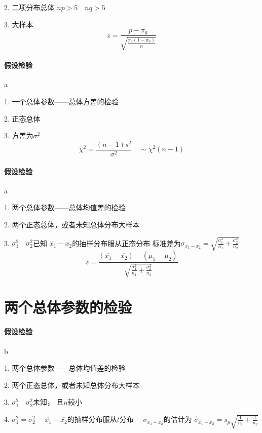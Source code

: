 \documentclass[UTF8,10pt]{book}
\begin{document}
{        2. 二项分布总体 $np>5 \quad nq>5$ 
        
        3. 大样本	
        $$ z = \frac{p-\pi_0}{ \sqrt{\frac{\pi_0(1-\pi_0)}{n}} } $$
        
        \paragraph{假设检验} a
        
        1. 一个总体参数——总体方差的检验 
        
        2. 正态总体 
        
        3. 方差为$\sigma^2$	
        $$ \chi^2 = \frac{(n-1)s^2}{\sigma^2} \quad \sim \chi^2(n-1) $$
        
        \paragraph{假设检验}   a
        
        1. 两个总体参数——总体均值差的检验 
        
        2. 两个正态总体，或者未知总体分布大样本 
        
        3. $\sigma_1^2 \quad \sigma_2^2$已知	
        $\overline{x_1} - \overline{x_2}$的抽样分布服从正态分布 
        标准差为$ \sigma_{\overline{x_1} - \overline{x_2}} =\sqrt{\frac{\sigma_1^2}{n_1}+\frac{\sigma_2^2}{n_2}} $ 
        $$ z = \frac{(\overline{x_1} - \overline{x_2} )- (\mu_1-\mu_2)}{\sqrt{\frac{\sigma_1^2}{n_1}+\frac{\sigma_2^2}{n_2}} } $$
        
    \section{两个总体参数的检验}

    
    \paragraph{假设检验} b
   
    1. 两个总体参数——总体均值差的检验 
    
    2. 两个正态总体，或者未知总体分布大样本 
    
    3. $\sigma_1^2 \quad \sigma_2^2$未知，
    且$n$较小 
    
    4. $\sigma_1^2 = \sigma_2^2 \quad$	
    $\overline{x_1} - \overline{x_2}$的抽样分布服从$t$分布 
    $\quad \sigma_{\overline{x_1} - \overline{x_2}} $的估计为 
    $ \hat{\sigma}_{\overline{x_1} - \overline{x_2}} =s_p \sqrt{\frac{1}{n_1}+\frac{1}{n_2}} $ 
    
}
\end{document}
